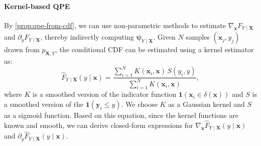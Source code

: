 \documentclass{article}
\theoremstyle{plain}
\theoremstyle{definition}
\theoremstyle{remark}
\begin{document}
\paragraph{Kernel-based QPE} By \cref{prop:qpe-from-cdf}, we can use non-parametric methods to estimate $\nabla_{\bm{x}}F_{Y\mid\bm{X}}$ and $\partial_yF_{Y\mid\bm{X}}$, thereby indirectly computing $\bm{\psi}_{Y\mid\bm{X}}$. Given $N$ samples $(\bm{x}_j,y_j)$ drawn from $p_{\bm{X},Y}$, the conditional CDF can be estimated using a kernel estimator as:
\[\hat{F}_{Y\mid\bm{X}}(y\mid\bm{x})=\frac{\sum_{i=1}^NK(\bm{x}_i,\bm{x})\,S(y_i,y)}{\sum_{i=1}^NK(\bm{x}_i,\bm{x})},\]
where $K$ is a smoothed version of the indicator function $\bm{1}(\bm{x}_i\in\delta(\bm{x}))$ and $S$ is a smoothed version of the $\bm{1}(\bm{y}_i\le y)$. We choose $K$ as a Gaussian kernel and $S$ as a sigmoid function. Based on this equation, since the kernel functions are known and smooth, we can derive closed-form expressions for $\nabla_{\bm{x}}\hat{F}_{Y\mid\bm{X}}(y\mid\bm{x})$ and $\partial_y\hat{F}_{Y\mid\bm{X}}(y\mid\bm{x})$.
\end{document}
